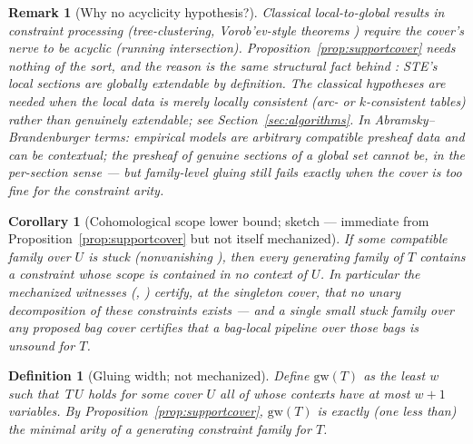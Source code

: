 \documentclass[11pt]{article}
\newtheorem{corollary}{Corollary}
\newtheorem{definition}{Definition}
\newtheorem{remark}{Remark}
\begin{document}
\begin{remark}[Why no acyclicity hypothesis?]
Classical local-to-global results in constraint processing
(tree-clustering, Vorob'ev-style theorems
\citep{dechterpearl1989tree,freuder1982backtrack}) require the cover's
nerve to be acyclic (running intersection).
Proposition~\ref{prop:supportcover} needs nothing of the sort, and
the reason is the same structural fact behind
: STE's local sections are \emph{globally
extendable by definition}.  The classical hypotheses are needed when
the local data is merely \emph{locally consistent} (arc- or
$k$-consistent tables) rather than genuinely extendable; see
Section~\ref{sec:algorithms}.  In Abramsky--Brandenburger terms:
empirical models are arbitrary compatible presheaf data and can be
contextual; the presheaf of genuine sections of a global set cannot
be, in the per-section sense --- but family-level gluing still fails
exactly when the cover is too fine for the constraint arity.
\end{remark}

\begin{corollary}[Cohomological scope lower bound; sketch ---
immediate from Proposition~\ref{prop:supportcover} but not itself
mechanized]
\label{cor:scopebound}
If some compatible family over $U$ is stuck (nonvanishing
), then \emph{every} generating family of
$T$ contains a constraint whose scope is contained in no context of
$U$.  In particular the mechanized witnesses
(,
) certify, at the singleton cover,
that no unary decomposition of these constraints exists --- and a
single small stuck family over any proposed bag cover certifies that
a bag-local pipeline over those bags is unsound for $T$.
\end{corollary}

\begin{definition}[Gluing width; not mechanized]
\label{def:gluingwidth}
Define $\mathrm{gw}(T)$ as the least $w$ such that
$\,T\,U$ holds for some cover $U$ all of whose
contexts have at most $w+1$ variables.  By
Proposition~\ref{prop:supportcover}, $\mathrm{gw}(T)$ is exactly
(one less than) the minimal \emph{arity} of a generating constraint
family for $T$.
\end{definition}
\end{document}
